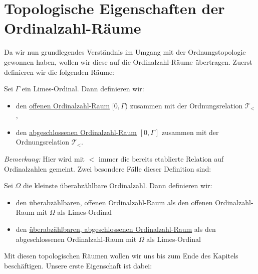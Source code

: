 \documentclass[11pt]{scrartcl}
\begin{document}
\section{Topologische Eigenschaften der Ordinalzahl-Räume}
Da wir nun grundlegendes Verständnis im Umgang mit der Ordnungstopologie gewonnen haben, wollen wir diese auf die Ordinalzahl-Räume übertragen. Zuerst definieren wir die folgenden Räume:
\begin{definition}
	Sei $\Gamma$ ein Limes-Ordinal. Dann definieren wir:
	\begin{itemize}
		\item den \underline{offenen Ordinalzahl-Raum} $[0,\Gamma)$ zusammen mit der Ordnungsrelation $\mathcal T_{<}$,
		\item den \underline{abgeschlossenen Ordinalzahl-Raum} $[0,\Gamma]$ zusammen mit der Ordnungsrelation $\mathcal T_{<}$.
	\end{itemize}
\end{definition}
\noindent \textit{Bemerkung: } Hier wird mit $<$ immer die bereits etablierte Relation auf Ordinalzahlen gemeint.
Zwei besondere Fälle dieser Definition sind:
\begin{definition}
	Sei $\Omega$ die kleinste überabzählbare Ordinalzahl. Dann definieren wir:
	\begin{itemize}
		\item den \underline{überabzählbaren, offenen Ordinalzahl-Raum} als den offenen Ordinalzahl-Raum mit $\Omega$ als Limes-Ordinal
		\item den \underline{überabzählbaren, abgeschlossenen Ordinalzahl-Raum} als den abgeschlossenen Ordinalzahl-Raum mit $\Omega$ als Limes-Ordinal
	\end{itemize}
\end{definition}
\noindent Mit diesen topologischen Räumen wollen wir uns bis zum Ende des Kapitels beschäftigen. Unsere erste Eigenschaft ist dabei:
\end{document}

